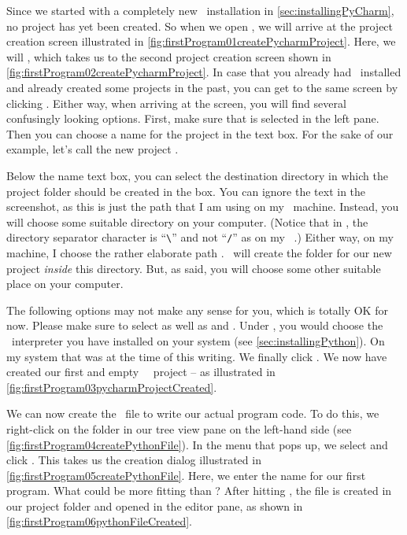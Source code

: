 Since we started with a completely new \pycharm\ installation in \cref{sec:installingPyCharm}, no project has yet been created.
So when we open \pycharm, we will arrive at the project creation screen illustrated in \cref{fig:firstProgram01createPycharmProject}.
Here, we will , which takes us to the second project creation screen shown in \cref{fig:firstProgram02createPycharmProject}.
In case that you already had \pycharm\ installed and already created some projects in the past, you can get to the same screen by clicking .
Either way, when arriving at the screen, you will find several confusingly looking options.
First, make sure that  is selected in the left pane.
Then you can choose a name for the project in the  text box.
For the sake of our example, let's call the new project .

Below the name text box, you can select the destination directory in which the project folder should be created in the  box.
You can ignore the text in the screenshot, as this is just the path that I am using on my \ubuntu\ machine.
Instead, you will choose some suitable directory on your computer.
(Notice that in \windows, the directory separator character is ``\verb=\='' and not ``\verb=/='' as on my \ubuntu\ \linux.)
Either way, on my machine, I choose the rather elaborate path .
\pycharm\ will create the folder  for our new project \emph{inside} this directory.
But, as said, you will choose some other suitable place on your computer.

The following options may not make any sense for you, which is totally OK for now.
Please make sure to select  as well as  and .
Under , you would choose the \python\ interpreter you have installed on your system (see \cref{sec:installingPython}).
On my system that was  at the time of this writing.
We finally click .
We now have created our first and empty \pycharm\ \python\ project -- as illustrated in \cref{fig:firstProgram03pycharmProjectCreated}.

We can now create the \python\ file to write our actual program code.
To do this, we right-click on the folder  in our  tree view pane on the left-hand side (see \cref{fig:firstProgram04createPythonFile}).
In the menu that pops up, we select and click .
This takes us the  creation dialog illustrated in \cref{fig:firstProgram05createPythonFile}.
Here, we enter the name for our first program.
What could be more fitting than ?
After hitting , the file is created in our project folder and opened in the editor pane, as shown in \cref{fig:firstProgram06pythonFileCreated}.

